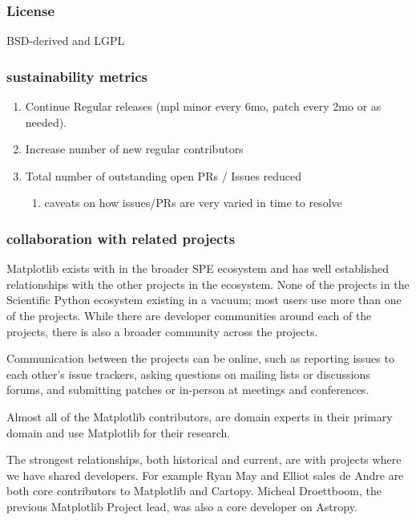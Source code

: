 \documentclass[12pt]{article}
\numberwithin{page}{section}
\begin{document}
\subsubsection{License}

BSD-derived and LGPL

\subsubsection{sustainability metrics}
\begin{enumerate}
\item Continue Regular releases (mpl minor every 6mo, patch every 2mo
  or as needed).
\item Increase number of new regular contributors
\item Total number of outstanding open PRs / Issues reduced
  \begin{enumerate}
  \item caveats on how issues/PRs are very varied in time to resolve
  \end{enumerate}
\end{enumerate}

\subsubsection{collaboration with related projects}

Matplotlib exists with in the broader SPE ecosystem and has well
established relationships with the other projects in the ecosystem.
None of the projects in the Scientific Python ecosystem existing in a
vacuum; most users use more than one of the projects.  While there are
developer communities around each of the projects, there is also a
broader community across the projects.

Communication between the projects can be online, such as reporting
issues to each other's issue trackers, asking questions on mailing
lists or discussions forums, and submitting patches or in-person at
meetings and conferences.

Almost all of the Matplotlib contributors, are domain experts in their
primary domain and use Matplotlib for their research.

The strongest relationships, both historical and current, are with
projects where we have shared developers.  For example Ryan May and
Elliot sales de Andre are both core contributors to Matplotlib and
Cartopy.  Micheal Droettboom, the previous Matplotlib Project lead,
was also a core developer on Astropy.
\end{document}
